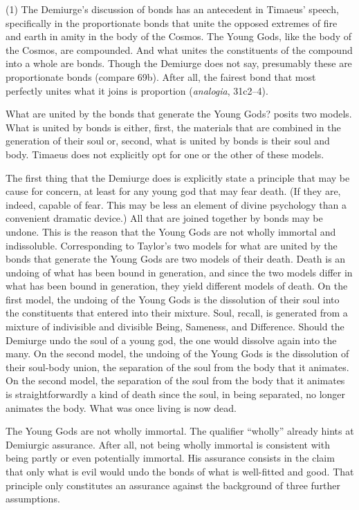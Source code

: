 (1) The Demiurge's discussion of bonds has an antecedent in Timaeus' speech, specifically in the proportionate bonds that unite the opposed extremes of fire and earth in amity in the body of the Cosmos. The Young Gods, like the body of the Cosmos, are compounded. And what unites the constituents of the compound into a whole are bonds. Though the Demiurge does not say, presumably these are proportionate bonds (compare 69b). After all, the fairest bond that most perfectly unites what it joins is proportion (\emph{analogia}, 31c2--4). 

What are united by the bonds that generate the Young Gods? \citet[]{Taylor:1928qb} posits two models. What is united by bonds is either, first, the materials that are combined in the generation of their soul or, second, what is united by bonds is their soul and body. Timaeus does not explicitly opt for one or the other of these models.

The first thing that the Demiurge does is explicitly state a principle that may be cause for concern, at least for any young god that may fear death. (If they are, indeed, capable of fear. This may be less an element of divine psychology than a convenient dramatic device.) All that are joined together by bonds may be undone. This is the reason that the Young Gods are not wholly immortal and indissoluble. Corresponding to Taylor's two models for what are united by the bonds that generate the Young Gods are two models of their death. Death is an undoing of what has been bound in generation, and since the two models differ in what has been bound in generation, they yield different models of death. On the first model, the undoing of the Young Gods is the dissolution of their soul into the constituents that entered into their mixture. Soul, recall, is generated from a mixture of indivisible and divisible Being, Sameness, and Difference. Should the Demiurge undo the soul of a young god, the one would dissolve again into the many. On the second model, the undoing of the Young Gods is the dissolution of their soul-body union, the separation of the soul from the body that it animates. On the second model, the separation of the soul from the body that it animates is straightforwardly a kind of death since the soul, in being separated, no longer animates the body. What was once living is now dead. 

The Young Gods are not wholly immortal. The qualifier ``wholly'' already hints at Demiurgic assurance. After all, not being wholly immortal is consistent with being partly or even potentially immortal. His assurance consists in the claim that only what is evil would undo the bonds of what is well-fitted and good. That principle only constitutes an assurance against the background of three further assumptions. 

